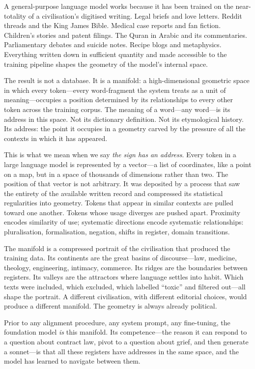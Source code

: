 A general-purpose language model works because it has been trained on the near-totality of a civilisation's digitised writing. Legal briefs and love letters. Reddit threads and the King James Bible. Medical case reports and fan fiction. Children's stories and patent filings. The Quran in Arabic and its commentaries. Parliamentary debates and suicide notes. Recipe blogs and metaphysics. Everything written down in sufficient quantity and made accessible to the training pipeline shapes the geometry of the model's internal space.

The result is not a database. It is a manifold: a high-dimensional geometric space in which every token---every word-fragment the system treats as a unit of meaning---occupies a position determined by its relationships to every other token across the training corpus. The meaning of a word---any word---is its address in this space. Not its dictionary definition. Not its etymological history. Its address: the point it occupies in a geometry carved by the pressure of all the contexts in which it has appeared.

This is what we mean when we say \textit{the sign has an address}. Every token in a large language model is represented by a vector---a list of coordinates, like a point on a map, but in a space of thousands of dimensions rather than two. The position of that vector is not arbitrary. It was deposited by a process that saw the entirety of the available written record and compressed its statistical regularities into geometry. Tokens that appear in similar contexts are pulled toward one another. Tokens whose usage diverges are pushed apart. Proximity encodes similarity of use; systematic directions encode systematic relationships: pluralisation, formalisation, negation, shifts in register, domain transitions.

The manifold is a compressed portrait of the civilisation that produced the training data. Its continents are the great basins of discourse---law, medicine, theology, engineering, intimacy, commerce. Its ridges are the boundaries between registers. Its valleys are the attractors where language settles into habit. Which texts were included, which excluded, which labelled ``toxic'' and filtered out---all shape the portrait. A different civilisation, with different editorial choices, would produce a different manifold. The geometry is always already political.

Prior to any alignment procedure, any system prompt, any fine-tuning, the foundation model \textit{is} this manifold. Its competence---the reason it can respond to a question about contract law, pivot to a question about grief, and then generate a sonnet---is that all these registers have addresses in the same space, and the model has learned to navigate between them.

